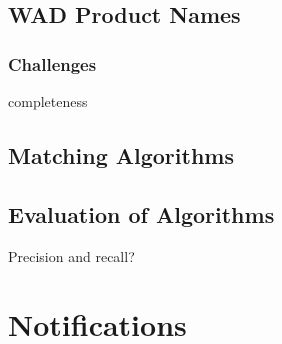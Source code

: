 \subsection{WAD Product Names}

\subsubsection{Challenges}
completeness

\subsection{Matching Algorithms}

\subsection{Evaluation of Algorithms}
Precision and recall?
\section{Notifications}




